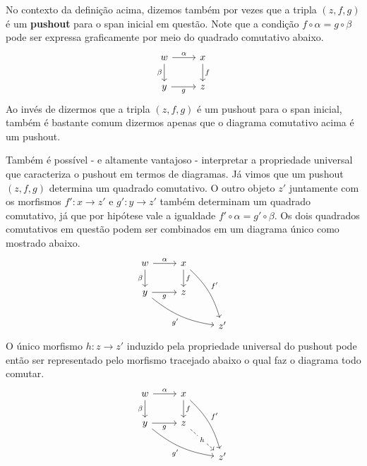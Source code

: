 No contexto da definição acima, dizemos também por vezes que a tripla $(z,f,g)$ é um \textbf{pushout} para o span inicial em questão.
Note que a condição $f \circ \alpha = g \circ \beta$ pode ser expressa graficamente por meio do quadrado comutativo abaixo.
\begin{equation}
  \label{eq:quadrado_pushout}
  \begin{tikzcd}
    w
    \arrow[r, "\alpha"]
    \arrow[d, "\beta" swap]
    & x
    \arrow[d, "f"]
    \\ y
    \arrow[r, "g" swap]
    & z
  \end{tikzcd}
\end{equation}
Ao invés de dizermos que a tripla $(z,f,g)$ é um pushout para o span inicial, também é bastante comum dizermos apenas que o diagrama comutativo acima é um pushout.

Também é possível - e altamente vantajoso - interpretar a propriedade universal que caracteriza o pushout em termos de diagramas.
Já vimos que um pushout $(z,f,g)$ determina um quadrado comutativo.
O outro objeto $z'$ juntamente com os morfismos $f': x \to z'$ e $g': y \to z'$ também determinam um quadrado comutativo, já que por hipótese vale a igualdade $f' \circ \alpha = g' \circ \beta$.
Os dois quadrados comutativos em questão podem ser combinados em um diagrama único como mostrado abaixo.
\begin{displaymath}
  \begin{tikzcd}
    w
    \arrow[r, "\alpha"]
    \arrow[d, "\beta" swap]
    & x
    \arrow[d, "f"]
    \arrow[rdd, bend left=15, "f'"]
    \\ y
    \arrow[r, "g" swap]
    \arrow[rrd, bend right=15, "g'" swap]
    & z
    \\ & & z'
  \end{tikzcd}
\end{displaymath}
O único morfismo $h: z \to z'$ induzido pela propriedade universal do pushout pode então ser representado pelo morfismo tracejado abaixo o qual faz o diagrama todo comutar.
\begin{displaymath}
  \begin{tikzcd}
    w
    \arrow[r, "\alpha"]
    \arrow[d, "\beta" swap]
    & x
    \arrow[d, "f"]
    \arrow[rdd, bend left=15, "f'"]
    \\ y
    \arrow[r, "g" swap]
    \arrow[rrd, bend right=15, "g'" swap]
    & z
    \arrow[rd, dashed, "h" description]
    \\ & & z'
  \end{tikzcd}
\end{displaymath}


